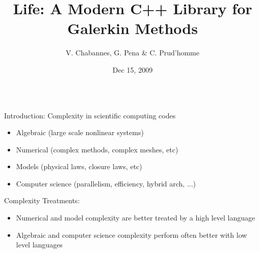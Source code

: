 \documentclass[final,utf8,,hyperref={pdfpagelabels=false}]{beamer}
\title[Life]{Life: A Modern C++ Library for Galerkin Methods}
\author[V. Chabannes, G. Pena \& C. Prud'homme]{V. Chabannes, G. Pena \& C. Prud'homme}
\institute[U. Coimbra \& U. Grenoble]{U. Coimbra and U. de Grenoble}
\date{Dec 15, 2009}
\begin{document}
  \begin{frame}[containsverbatim]{} 
    \vfill
    \begin{columns}[t]

    \begin{block}{Introduction: Complexity in scientific computing codes}
      \begin{itemize}
      \item Algebraic (large scale nonlinear systems)
      \item Numerical (complex methods, complex meshes, etc)
      \item Models (physical laws, closure laws, etc)
      \item Computer science (parallelism, efficiency, hybrid arch, ...)
      \end{itemize}
      
      Complexity Treatments:
      \begin{itemize}
      \item Numerical and model complexity are better treated by a
        \alert{high level language}
      \item Algebraic and computer science complexity perform often better with
        \alert{low level languages}
      \end{itemize}
    \end{block}
    
    \vfill


\end{columns}
\end{frame}
\end{document}
